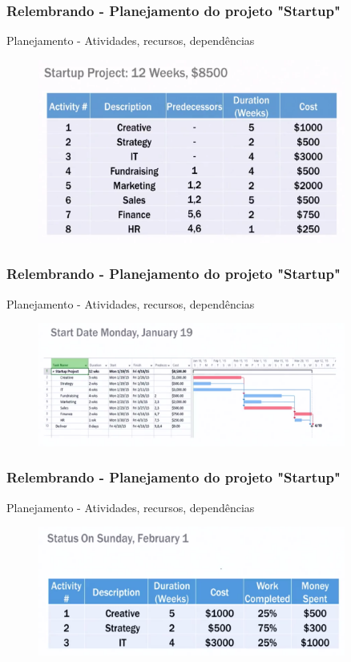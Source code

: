 \begin{frame}
 \frametitle{Relembrando - Planejamento do projeto "Startup"}
 Planejamento - Atividades, recursos, dependências
  \begin{figure}
   \centering
   \includegraphics[width = 0.9\textwidth]{figs/fig12.png}
  \end{figure}
\end{frame}

\begin{frame}
 \frametitle{Relembrando - Planejamento do projeto "Startup"}
 Planejamento - Atividades, recursos, dependências
  \begin{figure}
   \centering
   \includegraphics[width = 0.9\textwidth]{figs/fig13.png}
  \end{figure}
\end{frame}

\begin{frame}
 \frametitle{Relembrando - Planejamento do projeto "Startup"}
 Planejamento - Atividades, recursos, dependências
  \begin{figure}
   \centering
   \includegraphics[width = 0.9\textwidth]{figs/fig14.png}
  \end{figure}
\end{frame}

